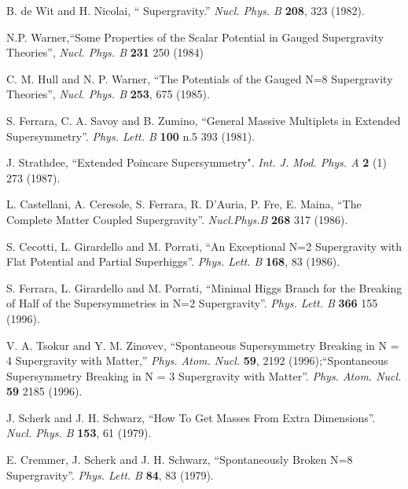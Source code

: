 \documentclass[a4paper,12pt]{article}
\begin{document}
\begin{thebibliography}{99}


B. de Wit and H. Nicolai, ``\coordHE{} Supergravity.'' {\it Nucl.
Phys. B} {\bf 208}, 323 (1982).


 N.P. Warner,``Some Properties of the Scalar Potential in
Gauged Supergravity Theories'',  {\it  Nucl. Phys. B} {\bf 231} 250 (1984) 



 C. M. Hull and  N. P. Warner,
``The Potentials of the Gauged N=8 Supergravity Theories'', {\it
Nucl.  Phys. B} {\bf 253}, 675 (1985).

 S. Ferrara, C. A. Savoy and B. Zumino, ``General Massive Multiplets
in Extended Supersymmetry''. {\it Phys. Lett. B} {\bf 100} n.5 393
(1981).

 J. Strathdee, ``Extended Poincare Supersymmetry".
 {\it Int. J. Mod. Phys. A} {\bf 2} (1) 273 (1987).

 L. Castellani, A. Ceresole, S. Ferrara, R. D'Auria, P. Fre, E.
Maina, ``The Complete \coordHE{} Matter Coupled Supergravity''. {\it
Nucl.Phys.B} {\bf 268} 317 (1986).


S. Cecotti, L. Girardello and M. Porrati, ``An Exceptional N=2
Supergravity with Flat Potential and Partial Superhiggs''. {\it
Phys. Lett. B} {\bf 168}, 83 (1986).



S. Ferrara, L. Girardello and M. Porrati, ``Minimal Higgs Branch
for the Breaking of Half of the Supersymmetries in N=2
Supergravity''. {\it Phys. Lett. B} {\bf 366}  155 (1996).



V. A. Tsokur and Y. M. Zinovev, ``Spontaneous Supersymmetry
Breaking in N = 4 Supergravity with Matter,'' {\it Phys.  Atom.
Nucl.}  {\bf 59}, 2192 (1996);``Spontaneous Supersymmetry Breaking
in N = 3 Supergravity with Matter''. {\it Phys.  Atom.  Nucl.}
{\bf 59} 2185 (1996).



J. Scherk and J. H. Schwarz, ``How To Get Masses From Extra
Dimensions''. {\it Nucl. Phys. B} {\bf 153}, 61 (1979).

 E. Cremmer, J. Scherk and J. H. Schwarz,
 ``Spontaneously Broken N=8 Supergravity''.
{\it Phys. Lett. B} {\bf 84}, 83 (1979).




\end{thebibliography}
\end{document}
